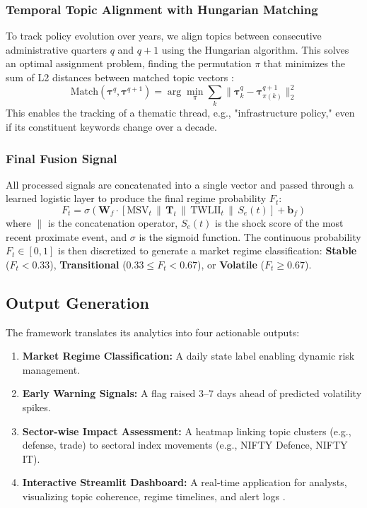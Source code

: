 \documentclass[11pt]{article}
\begin{document}
\subsubsection{Temporal Topic Alignment with Hungarian Matching}
To track policy evolution over years, we align topics between consecutive administrative quarters $q$ and $q+1$ using the Hungarian algorithm. This solves an optimal assignment problem, finding the permutation $\pi$ that minimizes the sum of L2 distances between matched topic vectors \cite{buehlmaier2018}:
\begin{equation}
\text{Match}(\boldsymbol{\tau}^{q}, \boldsymbol{\tau}^{q+1}) = \arg\min_{\pi} \sum_k \|\boldsymbol{\tau}_k^q - \boldsymbol{\tau}_{\pi(k)}^{q+1}\|_2^2
\label{eq:hungarian}
\end{equation}
This enables the tracking of a thematic thread, e.g., "infrastructure policy," even if its constituent keywords change over a decade.

\subsubsection{Final Fusion Signal}
All processed signals are concatenated into a single vector and passed through a learned logistic layer to produce the final regime probability $F_t$:
\begin{equation}
F_t = \sigma\left(\mathbf{W}_f \cdot [\text{MSV}_t \,\|\, \mathbf{T}_t \,\|\, \text{TWLII}_t \,\|\, S_e(t)] + \mathbf{b}_f\right)
\label{eq:fusion_signal}
\end{equation}
where $\|$ is the concatenation operator, $S_e(t)$ is the shock score of the most recent proximate event, and $\sigma$ is the sigmoid function. The continuous probability $F_t \in [0, 1]$ is then discretized to generate a market regime classification: \textbf{Stable} ($F_t < 0.33$), \textbf{Transitional} ($0.33 \leq F_t < 0.67$), or \textbf{Volatile} ($F_t \geq 0.67$).

\subsection{Output Generation}
The framework translates its analytics into four actionable outputs:
\begin{enumerate}[leftmargin=*, itemsep=0pt, topsep=4pt]
    \item \textbf{Market Regime Classification:} A daily state label enabling dynamic risk management.
    \item \textbf{Early Warning Signals:} A flag raised 3–7 days ahead of predicted volatility spikes.
    \item \textbf{Sector-wise Impact Assessment:} A heatmap linking topic clusters (e.g., defense, trade) to sectoral index movements (e.g., NIFTY Defence, NIFTY IT).
    \item \textbf{Interactive Streamlit Dashboard:} A real-time application for analysts, visualizing topic coherence, regime timelines, and alert logs \cite{biswal2022}.
\end{enumerate}
\end{document}
